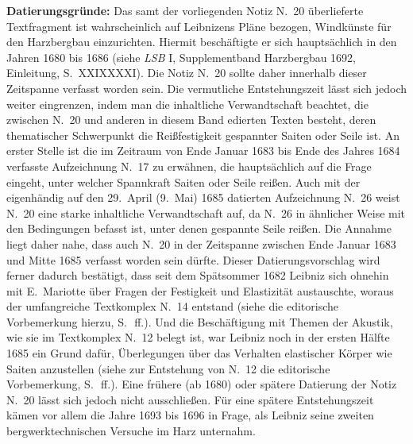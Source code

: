 \begin{ledgroup}%
\footnotesize%
\pstart%
\noindent%
\textbf{Datierungsgründe:}
Das samt der vorliegenden Notiz N.~20 überlieferte Textfragment ist wahrscheinlich auf Leibnizens Pläne bezogen, Windkünste für den Harzbergbau einzurichten.\protect{}
Hiermit beschäftigte er sich hauptsächlich in den Jahren 1680 bis 1686 (siehe \textit{LSB} I, Supplementband Harzbergbau 1692, Einleitung, S.~XXIX\textendash XXXI\cite{01337}).
Die Notiz N.~20 sollte daher innerhalb dieser Zeitspanne verfasst worden sein.
Die vermutliche Entstehungszeit lässt sich jedoch weiter eingrenzen, indem man die inhaltliche Verwandtschaft beachtet, die zwischen N.~20 und anderen in diesem Band edierten Texten besteht, deren thematischer Schwerpunkt die Reißfestigkeit gespannter Saiten oder Seile ist.
An erster Stelle ist die im Zeitraum von Ende Januar 1683 bis Ende des Jahres 1684 verfasste Aufzeichnung N.~17 zu erwähnen, die hauptsächlich auf die Frage eingeht, unter welcher Spannkraft Saiten oder Seile reißen.
Auch mit der eigenhändig auf den 29.~April (9.~Mai) 1685 datierten Aufzeichnung N.~26 weist N.~20 eine starke inhaltliche Verwandtschaft auf, da N.~26 in ähnlicher Weise mit den Bedingungen befasst ist, unter denen gespannte Seile reißen.
Die Annahme liegt daher nahe, dass auch N.~20 in der Zeitspanne zwischen Ende Januar 1683 und Mitte 1685 verfasst worden sein dürfte.
Dieser Datierungsvorschlag wird ferner dadurch bestätigt, dass seit dem Spätsommer 1682 Leibniz sich ohnehin mit E.~Mariotte\protect{} über Fragen der Festigkeit und Elastizität austauschte, woraus der umfangreiche Textkomplex N.~14 entstand (siehe die editorische Vorbemerkung hierzu, S.~\pageref{AE_1684_319-325_intro_jecg}\,ff.).
Und die Beschäftigung mit Themen der Akustik, wie sie im Textkomplex N.~12 belegt ist, war Leibniz noch in der ersten Hälfte 1685 ein Grund dafür, Überlegungen über das Verhalten elastischer Körper wie Saiten anzustellen (siehe zur Entstehung von N.~12 die editorische Vorbemerkung, S.~\pageref{cogitationesnovae-intro}\,ff.).
Eine frühere (ab 1680) oder spätere Datierung der Notiz N.~20 lässt sich jedoch nicht ausschließen.
Für eine spätere Entstehungszeit kämen vor allem die Jahre 1693 bis 1696 in Frage, als Leibniz seine zweiten bergwerktechnischen Versuche im Harz unternahm.
\pend%
\end{ledgroup}%
%
%
%
\frenchspacing%
%
 \vspace{8mm}
